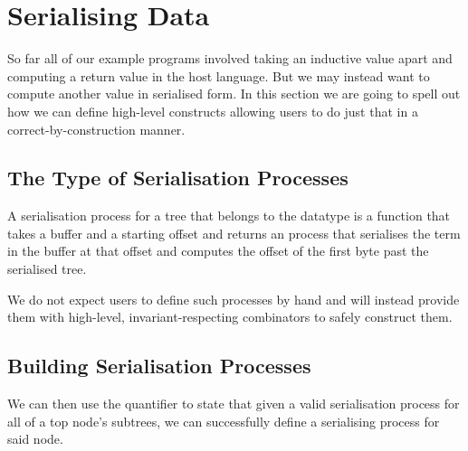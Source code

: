 \section{Serialising Data}\label{sec:serialising}

So far all of our example programs involved taking an inductive value
apart and computing a return value in the host language.
%
But we may instead want to compute another value in serialised form.
%
In this section we are going to spell out how we can define high-level
constructs allowing users to do just that in a correct-by-construction
manner.

\label{fig:serialised-map}


\subsection{The Type of Serialisation Processes}

A serialisation process for a tree  that belongs to the
datatype  is a function that takes a buffer
and a starting offset and returns an  process that
serialises the term in the buffer at that offset and computes the
offset of the first byte past the serialised tree.


We do not expect users to define such processes by hand and will instead
provide them with high-level, invariant-respecting combinators to safely
construct them.


\subsection{Building Serialisation Processes}


We can then use the  quantifier to state that given a
valid serialisation process for all of a top node's subtrees, we can
successfully define a serialising process for said node.


